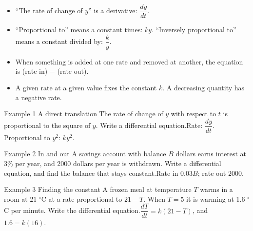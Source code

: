 \documentclass[11pt]{article}
\begin{document}

\begin{ideabox}
\begin{itemize}[leftmargin=*,itemsep=2pt,topsep=2pt]
  \item \textquotedblleft{}The rate of change of $y$\textquotedblright{} is a derivative: $\dfrac{dy}{dt}$.
  \item \textquotedblleft{}Proportional to\textquotedblright{} means a constant times: $ky$. \textquotedblleft{}Inversely proportional to\textquotedblright{} means a constant divided by: $\dfrac ky$.
  \item When something is added at one rate and removed at another, the equation is (rate in) $-$ (rate out).
  \item A given rate at a given value fixes the constant $k$. A decreasing quantity has a negative rate.
\end{itemize}
\end{ideabox}

\begin{example}{Example 1 \textperiodcentered{} A direct translation}
The rate of change of $y$ with respect to $t$ is proportional to the square of $y$. Write a differential equation.\soln Rate: $\dfrac{dy}{dt}$. Proportional to $y^2$: $ky^2$.
\end{example}

\begin{example}{Example 2 \textperiodcentered{} In and out}
A savings account with balance $B$ dollars earns interest at 3\% per year, and 2000 dollars per year is withdrawn. Write a differential equation, and find the balance that stays constant.\soln Rate in $0.03B$; rate out 2000.
\end{example}

\begin{example}{Example 3 \textperiodcentered{} Finding the constant}
A frozen meal at temperature $T$ warms in a room at 21 $^\circ$C at a rate proportional to $21-T$. When $T=5$ it is warming at 1.6 $^\circ$C per minute. Write the differential equation.\soln $\dfrac{dT}{dt}=k(21-T)$, and $1.6=k(16)$.
\end{example}

\newpage
{}
\end{document}
